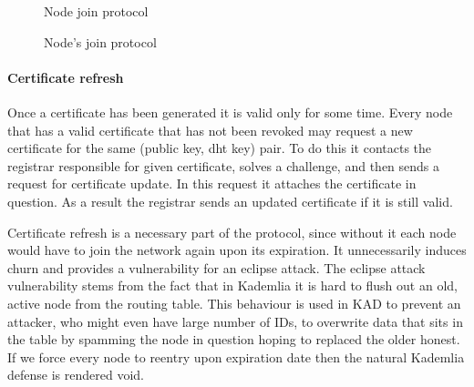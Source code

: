 \begin{figure}
\begin{msc}{Node join protocol}
\setlength{\instdist}{5.5cm}
\setlength{\envinstdist}{3cm}
\setlength{\instwidth}{2.5cm}
\nextlevel
{}
\nextlevel[5]
\nextlevel
{}
\nextlevel[1]


\nextlevel[6]


\nextlevel


\nextlevel[2]
\nextlevel[1]
\end{msc}
\caption{Node's join protocol}
\label{fig:node_join_prot}
\end{figure}

\paragraph{Certificate refresh} Once a certificate has been generated it is
valid only for some time. Every node that has a valid certificate that has not
been revoked may request a new certificate for the same (public key, dht key)
pair. To do this it contacts the registrar responsible for given certificate,
solves a challenge, and then sends a request for certificate update. In this
request it attaches the certificate in question. As a result the registrar sends
an updated certificate if it is still valid.

Certificate refresh is a necessary part of the protocol, since without it each
node would have to join the network again upon its expiration. It unnecessarily
induces churn and provides a vulnerability for an eclipse attack. The eclipse
attack vulnerability stems from the fact that in Kademlia it is hard to flush
out an old, active node from the routing table. This behaviour is used in KAD to
prevent an attacker, who might even have large number of IDs, to overwrite data
that sits in the table by spamming the node in question hoping to replaced the
older honest. If we force every node to reentry upon expiration date then the
natural Kademlia defense is rendered void.

